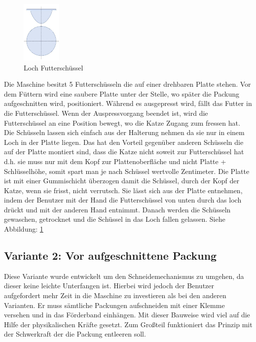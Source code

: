 \begin{figure}
\vspace{-40pt}
  \begin{center}
    \includegraphics[width=0.17\textwidth]{Bilder/Powerpoint/Loch_Futterschuessel}
  \end{center}
  \caption{Loch Futterschüssel}
  \label{Loch_Futterschuessel}
  \vspace{-10pt}
\end{figure}

Die Maschine besitzt 5 Futterschüsseln die auf einer drehbaren Platte stehen. Vor dem Füttern wird eine saubere Platte unter der Stelle, wo später die Packung aufgeschnitten wird, positioniert. Während es ausgepresst wird, fällt das Futter in die Futterschüssel. Wenn der Auspressvorgang beendet ist, wird die Futterschüssel an eine Position bewegt, wo die Katze Zugang zum fressen hat. Die Schüsseln lassen sich einfach aus der Halterung nehmen da sie nur in einem Loch in der Platte liegen. Das hat den Vorteil gegenüber anderen Schüsseln die auf der Platte montiert sind, dass die Katze nicht soweit zur Futterschüssel hat d.h. sie muss nur mit dem Kopf zur Plattenoberfläche und nicht Platte + Schlüsselhöhe, somit spart man je nach Schüssel wertvolle Zentimeter. Die Platte ist mit einer Gummischicht überzogen damit die Schüssel, durch der Kopf der Katze, wenn sie frisst, nicht verrutsch. Sie lässt sich aus der Platte entnehmen, indem der Benutzer mit der Hand die Futterschüssel von unten durch das loch drückt und mit der anderen Hand entnimmt. Danach werden die Schüsseln gewaschen, getrocknet und die Schüssel in das Loch fallen gelassen. Siehe Abbildung: \ref{Loch_Futterschuessel}



\subsection{Variante 2: Vor aufgeschnittene Packung }

Diese Variante wurde entwickelt um den Schneidemechanismus zu umgehen, da dieser keine leichte Unterfangen ist. Hierbei wird jedoch der Benutzer aufgefordert mehr Zeit in die Maschine zu investieren als bei den anderen Varianten. Er muss sämtliche Packungen aufschneiden mit einer Klemme versehen und in das Förderband einhängen. Mit dieser Bauweise wird viel auf die Hilfe der physikalischen Kräfte gesetzt. Zum Großteil funktioniert das Prinzip mit der Schwerkraft der die Packung entleeren soll.

